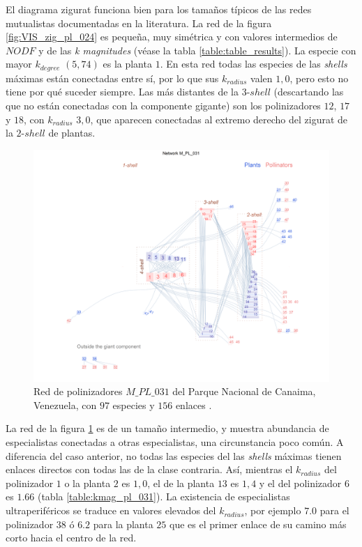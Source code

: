 El diagrama zigurat funciona bien para los tamaños típicos de las redes mutualistas documentadas en la literatura. La red de la figura \ref{fig:VIS_zig_pl_024} es pequeña, muy simétrica y con valores intermedios de $NODF$ y de las \textit{k magnitudes} (véase la tabla \ref{table:table_results}). La especie con mayor $k_{degree}$ $(5,74)$ es la planta $1$. En esta red todas las especies de las \textit{shells} máximas están conectadas entre sí, por lo que sus $k_{radius}$ valen $1,0$, pero esto no tiene por qué suceder siempre. Las más distantes de la $3$-$shell$ (descartando las que no están conectadas con la componente gigante) son los polinizadores $12$, $17$ y $18$, con  $k_{radius}$ $3,0$, que aparecen conectadas al extremo derecho del zigurat de la $2$-$shell$ de plantas.

\begin{figure}[h!]
\centering
\includegraphics[scale=0.45]{Figures/VIS_M_PL_031_ziggurat.png}
\caption {Red de polinizadores $M\_PL\_031$ del Parque Nacional de Canaima, Venezuela, con $97$ especies y $156$ enlaces \cite{ramirez1989biologia}.}
\label{fig:VIS_M_PL_031_ziggurat}
\end{figure}

La red de la figura \ref{fig:VIS_M_PL_031_ziggurat} es de un tamaño intermedio, y muestra abundancia de especialistas conectadas a otras especialistas, una circunstancia poco común. A diferencia del caso anterior, no todas las especies del las \textit{shells} máximas tienen enlaces directos con todas las de la clase contraria. Así, mientras el $k_{radius}$ del polinizador $1$ o la planta $2$ es $1,0$, el de la planta $13$ es $1,4$ y el del polinizador $6$ es $1.66$ (tabla \ref{table:kmag_pl_031}). La existencia de especialistas ultraperiféricos se traduce en valores elevados del $k_{radius}$, por ejemplo $7.0$ para el polinizador $38$ ó $6.2$ para la planta $25$ que es el primer enlace de su camino más corto hacia el centro de la red.


